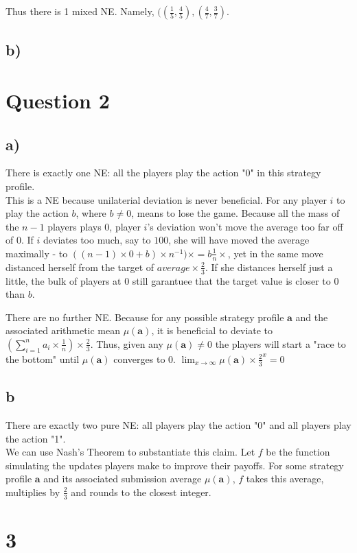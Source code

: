 \documentclass[10pt,a4paper]{article}
\begin{document}
Thus there is 1 mixed NE. Namely, $((\tfrac{1}{5},\tfrac{4}{5}),(\tfrac{4}{7},\tfrac{3}{7})$.

\subsection*{b)}
\section*{Question 2}
\subsection*{a)}
There is exactly one NE: all the players play the action "0" in this strategy profile.\\
This is a NE because unilaterial deviation is never beneficial. For any player $i$ to play the action $b$, where $b\neq 0$, means to lose the game. Because all the mass of the $n-1$ players plays $0$, player $i$'s deviation won't move the average too far off of $0$. If $i$ deviates too much, say to $100$, she will have moved the average maximally - to $((n-1)\times 0 + b)\times n^{-1})\times=b \tfrac{1}{n}\times$, yet in the same move distanced herself from the target of $average \times \tfrac{2}{3}$. If she distances herself just a little, the bulk of players at $0$ still garantuee that the target value is closer to $0$ than $b$.

There are no further NE. Because for any possible strategy profile $\textbf{a}$ and the associated arithmetic mean $\mu(\textbf{a})$, it is beneficial to deviate to $(\sum^n_{i=1} a_i \times \tfrac{1}{n})\times \tfrac{2}{3}$. Thus, given any $\mu(\textbf{a})\neq 0$ the players will start a "race to the bottom" until $\mu(\textbf{a})$ converges to $0$. $\lim_{x\rightarrow \infty} \mu(\textbf{a})\times \tfrac{2}{3}^x=0$
\subsection*{b}
There are exactly two pure NE: all players play the action "0" and all players play the action "1". \\
We can use Nash's Theorem to substantiate this claim. Let $f$ be the function simulating the updates players make to improve their payoffs. For some strategy profile $\textbf{a}$ and its associated submission average $\mu(\textbf{a})$, $f$ takes this average, multiplies by $\tfrac{2}{3}$ and rounds to the closest integer.

\section*{3}
\end{document}
